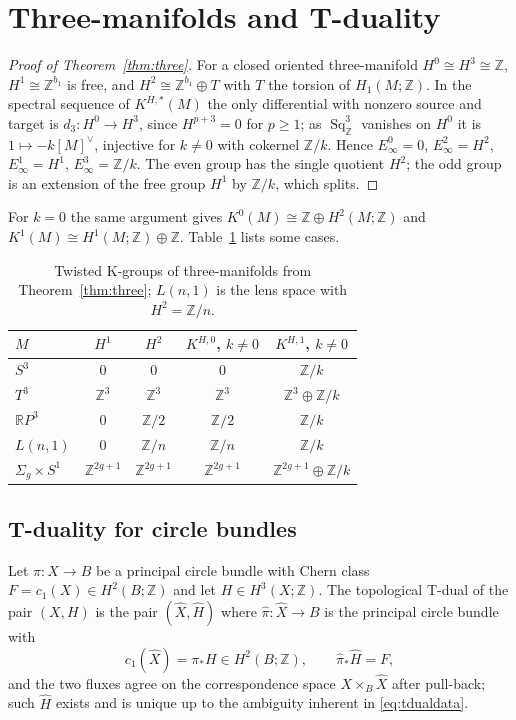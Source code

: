 \documentclass[reqno,11pt]{amsart}
\theoremstyle{definition}
\newcommand{\ZZ}{\mathbb{Z}}
\newcommand{\RR}{\mathbb{R}}
\newcommand{\Sq}{\operatorname{Sq}}
\begin{document}
\section{Three-manifolds and T-duality}\label{sec:three}

\begin{proof}[Proof of Theorem~\ref{thm:three}]
For a closed oriented three-manifold $H^0\cong H^3\cong\ZZ$, $H^1\cong\ZZ^{b_1}$ is free, and $H^2\cong\ZZ^{b_1}\oplus T$ with $T$ the torsion of $H_1(M;\ZZ)$. In the spectral sequence of $K^{H,*}(M)$ the only differential with nonzero source and target is $d_3\colon H^0\to H^3$, since $H^{p+3}=0$ for $p\ge1$; as $\Sq^3_\ZZ$ vanishes on $H^0$ it is $1\mapsto -k[M]^\vee$, injective for $k\ne0$ with cokernel $\ZZ/k$. Hence $E_\infty^0=0$, $E_\infty^2=H^2$, $E_\infty^1=H^1$, $E_\infty^3=\ZZ/k$. The even group has the single quotient $H^2$; the odd group is an extension of the free group $H^1$ by $\ZZ/k$, which splits.
\end{proof}

For $k=0$ the same argument gives $K^0(M)\cong\ZZ\oplus H^2(M;\ZZ)$ and $K^1(M)\cong H^1(M;\ZZ)\oplus\ZZ$. Table~\ref{tab:three} lists some cases.

\begin{table}[ht]
\centering
\caption{Twisted K-groups of three-manifolds from Theorem~\ref{thm:three}; $L(n,1)$ is the lens space with $H^2=\ZZ/n$.}
\label{tab:three}
\begin{tabular}{lcccc}
\toprule
$M$ & $H^1$ & $H^2$ & $K^{H,0}$, $k\neq0$ & $K^{H,1}$, $k\ne0$\\
\midrule
$S^3$ & $0$ & $0$ & $0$ & $\ZZ/k$\\
$T^3$ & $\ZZ^3$ & $\ZZ^3$ & $\ZZ^3$ & $\ZZ^3\oplus\ZZ/k$\\
$\RR P^3$ & $0$ & $\ZZ/2$ & $\ZZ/2$ & $\ZZ/k$\\
$L(n,1)$ & $0$ & $\ZZ/n$ & $\ZZ/n$ & $\ZZ/k$\\
$\Sigma_g\times S^1$ & $\ZZ^{2g+1}$ & $\ZZ^{2g+1}$ & $\ZZ^{2g+1}$ & $\ZZ^{2g+1}\oplus\ZZ/k$\\
\bottomrule
\end{tabular}
\end{table}

\subsection{T-duality for circle bundles}
Let $\pi\colon X\to B$ be a principal circle bundle with Chern class $F=c_1(X)\in H^2(B;\ZZ)$ and let $H\in H^3(X;\ZZ)$. The topological T-dual of the pair $(X,H)$ is the pair $(\widehat X,\widehat H)$ where $\widehat\pi\colon\widehat X\to B$ is the principal circle bundle with
\begin{equation}\label{eq:tdualdata}
c_1(\widehat X)=\pi_*H\in H^2(B;\ZZ),\qquad\widehat\pi_*\widehat H=F,
\end{equation}
and the two fluxes agree on the correspondence space $X\times_B\widehat X$ after pull-back; such $\widehat H$ exists and is unique up to the ambiguity inherent in \eqref{eq:tdualdata}.
\end{document}
